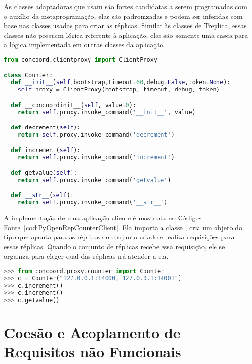 As classes adaptadoras que usam  são fortes candidatas a serem programadas com o auxílio da metaprogramação, elas são padronizadas e podem ser inferidas com base nas classes usadas para criar as réplicas. Similar às classes  de Treplica, essas classes não possuem lógica referente à aplicação, elas são somente uma casca para a lógica implementada em outras classes da aplicação.

\begin{lstlisting}[language=Python, caption={Classe \textbf{proxy} para a classe \textbf{Counter}}, label={cod:PyOpenRepCounterInter}]
from concoord.clientproxy import ClientProxy

class Counter:
  def __init__(self,bootstrap,timeout=60,debug=False,token=None):
    self.proxy = ClientProxy(bootstrap, timeout, debug, token)

  def __concoordinit__(self, value=0):
    return self.proxy.invoke_command('__init__', value)

  def decrement(self):
    return self.proxy.invoke_command('decrement')

  def increment(self):
    return self.proxy.invoke_command('increment')

  def getvalue(self):
    return self.proxy.invoke_command('getvalue')

  def __str__(self):
    return self.proxy.invoke_command('__str__')
\end{lstlisting}

A implementação de uma aplicação cliente é mostrada no Código-Fonte~\ref{cod:PyOpenRepCounterClient}. Ela importa a classe , cria um objeto do tipo  que aponta para as réplicas do conjunto criado e realiza requisições para essas réplicas. Quando o conjunto de réplicas recebe essa requisição, ele se organiza para eleger qual das réplicas irá atender a ela.

\begin{lstlisting}[language=Python, caption={Implementação do cliente que acessa as réplicas de \textbf{Counter}}, label={cod:PyOpenRepCounterClient}]
>>> from concoord.proxy.counter import Counter
>>> c = Counter("127.0.0.1:14000, 127.0.0.1:14001")
>>> c.increment()
>>> c.increment()
>>> c.getvalue()
\end{lstlisting}

\section{Coesão e Acoplamento de Requisitos não Funcionais}
\label{sec:acoplamento}

